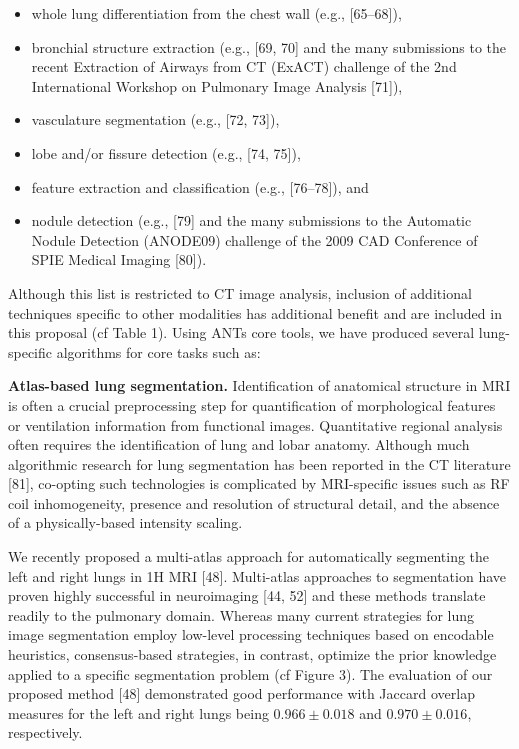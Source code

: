\documentclass[11pt,]{article}
\begin{document}
\begin{itemize}
\itemsep1pt\parskip0pt
\item
  whole lung differentiation from the chest wall (e.g., {[}65--68{]}),
\item
  bronchial structure extraction (e.g., {[}69, 70{]} and the many
  submissions to the recent Extraction of Airways from CT (ExACT)
  challenge of the 2nd International Workshop on Pulmonary Image
  Analysis {[}71{]}),
\item
  vasculature segmentation (e.g., {[}72, 73{]}),
\item
  lobe and/or fissure detection (e.g., {[}74, 75{]}),
\item
  feature extraction and classification (e.g., {[}76--78{]}), and
\item
  nodule detection (e.g., {[}79{]} and the many submissions to the
  Automatic Nodule Detection (ANODE09) challenge of the 2009 CAD
  Conference of SPIE Medical Imaging {[}80{]}).
\end{itemize}

Although this list is restricted to CT image analysis, inclusion of
additional techniques specific to other modalities has additional
benefit and are included in this proposal (cf Table 1). Using ANTs core
tools, we have produced several lung-specific algorithms for core tasks
such as:

\textbf{Atlas-based lung segmentation.} Identification of anatomical
structure in MRI is often a crucial preprocessing step for
quantification of morphological features or ventilation information from
functional images. Quantitative regional analysis often requires the
identification of lung and lobar anatomy. Although much algorithmic
research for lung segmentation has been reported in the CT literature
{[}81{]}, co-opting such technologies is complicated by MRI-specific
issues such as RF coil inhomogeneity, presence and resolution of
structural detail, and the absence of a physically-based intensity
scaling.

We recently proposed a multi-atlas approach for automatically segmenting
the left and right lungs in 1H MRI {[}48{]}. Multi-atlas approaches to
segmentation have proven highly successful in neuroimaging {[}44, 52{]}
and these methods translate readily to the pulmonary domain. Whereas
many current strategies for lung image segmentation employ low-level
processing techniques based on encodable heuristics, consensus-based
strategies, in contrast, optimize the prior knowledge applied to a
specific segmentation problem (cf Figure 3). The evaluation of our
proposed method {[}48{]} demonstrated good performance with Jaccard
overlap measures for the left and right lungs being $0.966 \pm 0.018$
and $0.970 \pm 0.016$, respectively.
\end{document}
